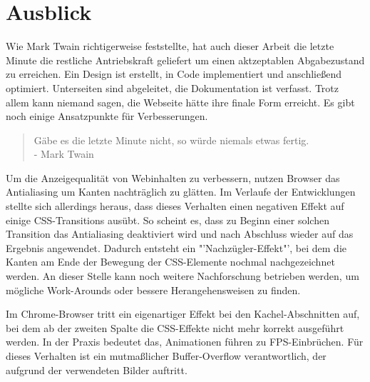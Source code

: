 \chapter{Ausblick}
Wie Mark Twain richtigerweise feststellte, hat auch dieser Arbeit die letzte Minute die restliche Antriebskraft geliefert um einen aktzeptablen Abgabezustand zu erreichen. Ein Design ist erstellt, in Code implementiert und anschließend optimiert. Unterseiten sind abgeleitet, die Dokumentation ist verfasst. Trotz allem kann niemand sagen, die Webseite hätte ihre finale Form erreicht. Es gibt noch einige Ansatzpunkte für Verbesserungen.

\begin{quote}
	Gäbe es die letzte Minute nicht, so würde niemals etwas fertig.\\
	- Mark Twain
\end{quote}

Um die Anzeigequalität von Webinhalten zu verbessern, nutzen Browser das Antialiasing um Kanten nachträglich zu glätten. Im Verlaufe der Entwicklungen stellte sich allerdings heraus, dass dieses Verhalten einen negativen Effekt auf einige CSS-Transitions ausübt. So scheint es, dass zu Beginn einer solchen Transition das Antialiasing deaktiviert wird und nach Abschluss wieder auf das Ergebnis angewendet. Dadurch entsteht ein "'Nachzügler-Effekt"', bei dem die Kanten am Ende der Bewegung der CSS-Elemente nochmal nachgezeichnet werden.
An dieser Stelle kann noch weitere Nachforschung betrieben werden, um mögliche Work-Arounds oder bessere Herangehensweisen zu finden.

Im Chrome-Browser tritt ein eigenartiger Effekt bei den Kachel-Abschnitten auf, bei dem ab der zweiten Spalte die CSS-Effekte nicht mehr korrekt ausgeführt werden. In der Praxis bedeutet das, Animationen führen zu FPS-Einbrüchen. Für dieses Verhalten ist ein mutmaßlicher Buffer-Overflow verantwortlich, der aufgrund der verwendeten Bilder auftritt.